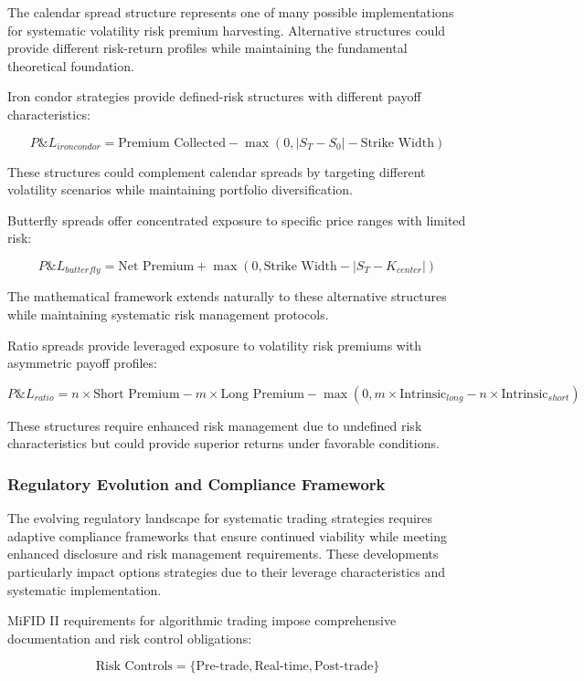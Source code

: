 \documentclass[
  american,
  11pt,
  11pt,
  letterpaper,
  onecolumn]{article}
\begin{document}
The calendar spread structure represents one of many possible
implementations for systematic volatility risk premium harvesting.
Alternative structures could provide different risk-return profiles
while maintaining the fundamental theoretical foundation.

Iron condor strategies provide defined-risk structures with different
payoff characteristics:

\[P\&L_{iron condor} = \text{Premium Collected} - \max(0, |S_T - S_0| - \text{Strike Width})\]

These structures could complement calendar spreads by targeting
different volatility scenarios while maintaining portfolio
diversification.

Butterfly spreads offer concentrated exposure to specific price ranges
with limited risk:

\[P\&L_{butterfly} = \text{Net Premium} + \max(0, \text{Strike Width} - |S_T - K_{center}|)\]

The mathematical framework extends naturally to these alternative
structures while maintaining systematic risk management protocols.

Ratio spreads provide leveraged exposure to volatility risk premiums
with asymmetric payoff profiles:

\[P\&L_{ratio} = n \times \text{Short Premium} - m \times \text{Long Premium} - \max(0, m \times \text{Intrinsic}_{long} - n \times \text{Intrinsic}_{short})\]

These structures require enhanced risk management due to undefined risk
characteristics but could provide superior returns under favorable
conditions.

\subsubsection{Regulatory Evolution and Compliance
Framework}\label{regulatory-evolution-and-compliance-framework}

The evolving regulatory landscape for systematic trading strategies
requires adaptive compliance frameworks that ensure continued viability
while meeting enhanced disclosure and risk management requirements.
These developments particularly impact options strategies due to their
leverage characteristics and systematic implementation.

MiFID II requirements for algorithmic trading impose comprehensive
documentation and risk control obligations:

\[\text{Risk Controls} = \{\text{Pre-trade}, \text{Real-time}, \text{Post-trade}\}\]
\end{document}
